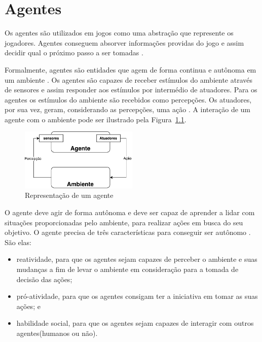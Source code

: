 \chapter{\label{chap:agentes}Agentes} 

Os agentes são utilizados em jogos como uma abstração que represente os jogadores. Agentes conseguem absorver informações providas do jogo e assim decidir qual o próximo passo a ser tomadas \cite{millington2009artificial}. 

Formalmente, agentes são entidades que agem de forma continua e autônoma em um ambiente \cite{agent1993oriented}. 
Os agentes são capazes de receber estímulos do ambiente através de sensores e assim responder aos estímulos por intermédio de atuadores. 
Para os agentes os estímulos do ambiente são recebidos como percepções. 
Os atuadores, por sua vez, geram, considerando as percepções, uma ação \cite{intelligence2003modern}. 
A interação de um agente com o ambiente pode ser ilustrado pela Figura~\ref{fig:agente}.


\begin{figure}[ht]
	\centering
	\includegraphics[width=0.5\textwidth]{fig/agente.pdf}
	\caption{Representação de um agente}
	\label{fig:agente}
\end{figure} 

O agente deve agir de forma autônoma e deve ser capaz de aprender a lidar com situações proporcionadas pelo ambiente, para realizar ações em busca do seu objetivo. O agente precisa de três características para conseguir ser autônomo \cite{agent1999}. São elas:
 
\begin{itemize}
	\item reatividade, para que os agentes sejam capazes de perceber o ambiente e suas mudanças a fim de levar o ambiente em consideração para a tomada de decisão das ações;
	\item pró-atividade, para que os agentes consigam ter a iniciativa em tomar as suas ações; e
	\item habilidade social, para que os agentes sejam capazes de interagir com outros agentes(humanos ou não).
\end{itemize}

